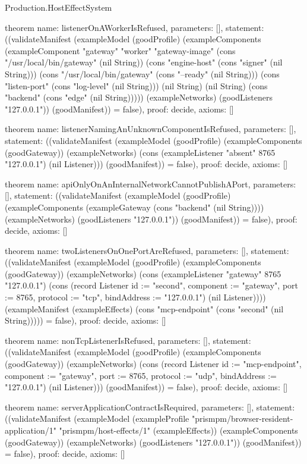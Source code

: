 \begin{lexlean}{Production.HostEffectSystem}
\begin{semanticmodule}
theorem{
  name: listenerOnAWorkerIsRefused,
  parameters: [],
  statement: ((validateManifest (exampleModel (goodProfile) (exampleComponents (exampleComponent "gateway" "worker" "gateway-image" (cons "/usr/local/bin/gateway" (nil String)) (cons "engine-host" (cons "signer" (nil String))) (cons "/usr/local/bin/gateway" (cons "--ready" (nil String))) (cons "listen-port" (cons "log-level" (nil String))) (nil String) (nil String) (cons "backend" (cons "edge" (nil String))))) (exampleNetworks) (goodListeners "127.0.0.1")) (goodManifest)) = false),
  proof: decide{},
  axioms: []
}

theorem{
  name: listenerNamingAnUnknownComponentIsRefused,
  parameters: [],
  statement: ((validateManifest (exampleModel (goodProfile) (exampleComponents (goodGateway)) (exampleNetworks) (cons (exampleListener "absent" 8765 "127.0.0.1") (nil Listener))) (goodManifest)) = false),
  proof: decide{},
  axioms: []
}

theorem{
  name: apiOnlyOnAnInternalNetworkCannotPublishAPort,
  parameters: [],
  statement: ((validateManifest (exampleModel (goodProfile) (exampleComponents (exampleGateway (cons "backend" (nil String)))) (exampleNetworks) (goodListeners "127.0.0.1")) (goodManifest)) = false),
  proof: decide{},
  axioms: []
}

theorem{
  name: twoListenersOnOnePortAreRefused,
  parameters: [],
  statement: ((validateManifest (exampleModel (goodProfile) (exampleComponents (goodGateway)) (exampleNetworks) (cons (exampleListener "gateway" 8765 "127.0.0.1") (cons (record Listener {id := "second", component := "gateway", port := 8765, protocol := "tcp", bindAddress := "127.0.0.1"}) (nil Listener)))) (exampleManifest (exampleEffects) (cons "mcp-endpoint" (cons "second" (nil String))))) = false),
  proof: decide{},
  axioms: []
}

theorem{
  name: nonTcpListenerIsRefused,
  parameters: [],
  statement: ((validateManifest (exampleModel (goodProfile) (exampleComponents (goodGateway)) (exampleNetworks) (cons (record Listener {id := "mcp-endpoint", component := "gateway", port := 8765, protocol := "udp", bindAddress := "127.0.0.1"}) (nil Listener))) (goodManifest)) = false),
  proof: decide{},
  axioms: []
}

theorem{
  name: serverApplicationContractIsRequired,
  parameters: [],
  statement: ((validateManifest (exampleModel (exampleProfile "prismpm/browser-resident-application/1" "prismpm/host-effects/1" (exampleEffects)) (exampleComponents (goodGateway)) (exampleNetworks) (goodListeners "127.0.0.1")) (goodManifest)) = false),
  proof: decide{},
  axioms: []
}


\end{semanticmodule}
\end{lexlean}
